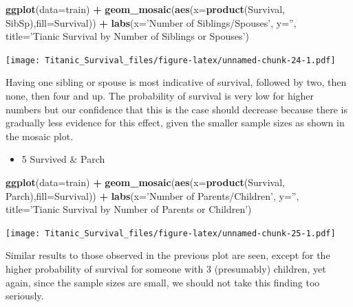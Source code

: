 \documentclass[]{article}
\newenvironment{Shaded}{\begin{snugshade}}{\end{snugshade}}
\newcommand{\KeywordTok}[1]{\textcolor[rgb]{0.13,0.29,0.53}{\textbf{#1}}}
\newcommand{\DataTypeTok}[1]{\textcolor[rgb]{0.13,0.29,0.53}{#1}}
\newcommand{\StringTok}[1]{\textcolor[rgb]{0.31,0.60,0.02}{#1}}
\newcommand{\OperatorTok}[1]{\textcolor[rgb]{0.81,0.36,0.00}{\textbf{#1}}}
\newcommand{\NormalTok}[1]{#1}
\providecommand{\tightlist}{%
  \setlength{\itemsep}{0pt}\setlength{\parskip}{0pt}}
\begin{document}
\begin{Shaded}
\begin{Highlighting}[]
\KeywordTok{ggplot}\NormalTok{(}\DataTypeTok{data=}\NormalTok{train) }\OperatorTok{+}
\StringTok{   }\KeywordTok{geom_mosaic}\NormalTok{(}\KeywordTok{aes}\NormalTok{(}\DataTypeTok{x=}\KeywordTok{product}\NormalTok{(Survival, SibSp),}\DataTypeTok{fill=}\NormalTok{Survival)) }\OperatorTok{+}
\StringTok{   }\KeywordTok{labs}\NormalTok{(}\DataTypeTok{x=}\StringTok{'Number of Siblings/Spouses'}\NormalTok{, }\DataTypeTok{y=}\StringTok{''}\NormalTok{, }
   \DataTypeTok{title=}\StringTok{'Tianic Survival by Number of Siblings or Spouses'}\NormalTok{)}
\end{Highlighting}
\end{Shaded}

\texttt{[image: Titanic\_Survival\_files/figure-latex/unnamed-chunk-24-1.pdf]}

Having one sibling or spouse is most indicative of survival, followed by
two, then none, then four and up. The probability of survival is very
low for higher numbers but our confidence that this is the case should
decrease because there is gradually less evidence for this effect, given
the smaller sample sizes as shown in the mosaic plot.

\begin{itemize}
\tightlist
\item
  5 Survived \& Parch
\end{itemize}

\begin{Shaded}
\begin{Highlighting}[]
\KeywordTok{ggplot}\NormalTok{(}\DataTypeTok{data=}\NormalTok{train) }\OperatorTok{+}
\StringTok{   }\KeywordTok{geom_mosaic}\NormalTok{(}\KeywordTok{aes}\NormalTok{(}\DataTypeTok{x=}\KeywordTok{product}\NormalTok{(Survival, Parch),}\DataTypeTok{fill=}\NormalTok{Survival)) }\OperatorTok{+}
\StringTok{   }\KeywordTok{labs}\NormalTok{(}\DataTypeTok{x=}\StringTok{'Number of Parents/Children'}\NormalTok{, }\DataTypeTok{y=}\StringTok{''}\NormalTok{, }
   \DataTypeTok{title=}\StringTok{'Tianic Survival by Number of Parents or Children'}\NormalTok{)}
\end{Highlighting}
\end{Shaded}

\texttt{[image: Titanic\_Survival\_files/figure-latex/unnamed-chunk-25-1.pdf]}

Similar results to those observed in the previous plot are seen, except
for the higher probability of survival for someone with 3 (presumably)
children, yet again, since the sample sizes are small, we should not
take this finding too seriously.
\end{document}
